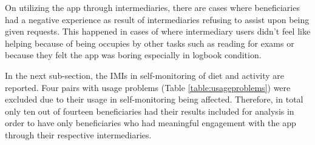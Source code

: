 On utilizing the app through intermediaries, there are cases where beneficiaries had a negative experience as result of intermediaries refusing to assist upon being given requests. This happened in cases of where intermediary users didn't feel like helping because of being occupies by other tasks such as reading for exams or because they felt the app was boring especially in logbook condition. 

In the next sub-section, the IMIs in self-monitoring of diet and activity are reported. Four pairs with usage problems (Table \ref{table:usageproblems}) were excluded due to their usage in self-monitoring being affected. Therefore, in total only ten out of fourteen beneficiaries had their results included for analysis in order to have only beneficiaries who had meaningful engagement with the app through their respective intermediaries.
